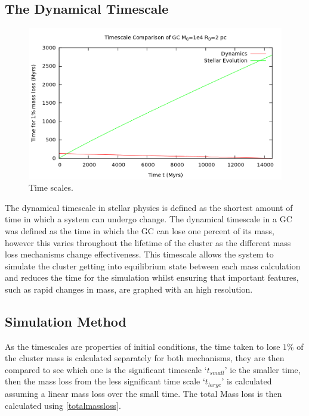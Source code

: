 \documentclass[%
 aip,
 jmp,%
 amsmath,amssymb,
 reprint,%
]{revtex4-1}
\begin{document}
\subsection{\label{sec:level2}The Dynamical Timescale}

\begin{figure}[H]
\centering
\includegraphics[width=1\textwidth]{fig4.png}
\caption{Time scales. \cite{Lamers2005}}
\label{timescale}
\end{figure}

The dynamical timescale in stellar physics is defined as the shortest amount of time in which a system can undergo change. The  dynamical timescale in a GC was defined as the time in which the GC can lose one percent of its mass, however this varies throughout the lifetime of the cluster as the different mass loss mechanisms change effectiveness. This timescale allows the system to simulate the cluster getting into equilibrium state between each mass calculation and reduces the time for the simulation whilst ensuring that important features, such as rapid changes in mass, are graphed with an high resolution. 






\subsection{\label{sec:level2}Simulation Method}
As the timescales are properties of initial conditions, the time taken to lose $1\%$ of the cluster mass is calculated separately for both mechanisms, they are then compared to see which one is the significant timescale `$t_{small}$' ie the smaller time, then the mass loss from the less significant time scale `$t_{large}$' is calculated assuming a linear mass loss over the small time. The total Mass loss is then calculated using \eqref{totalmassloss}.
\end{document}
